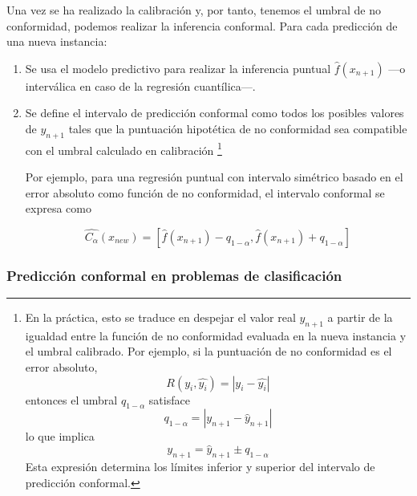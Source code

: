 Una vez se ha realizado la calibración y, por tanto, tenemos el umbral de no conformidad, podemos realizar
la inferencia conformal. Para cada predicción de una nueva instancia: 

\begin{enumerate}

    \item Se usa el modelo predictivo para realizar la inferencia puntual $\hat{f}(x_{n+1})$ ---o interválica 
    en caso de la regresión cuantílica---.

    \item Se define el intervalo de predicción conformal como todos los posibles valores de $y_{n+1}$ tales 
    que la puntuación hipotética de no conformidad sea compatible con el umbral calculado en calibración
    \footnote{
        En la práctica, esto se traduce en despejar el valor real $y_{n+1}$ a partir de la igualdad entre la 
        función de no conformidad evaluada en la nueva instancia y el umbral calibrado. Por ejemplo, si la 
        puntuación de no conformidad es el error absoluto,
        $$
        R(y_i, \hat{y_i}) = | y_i - \hat{y_i} |
        $$
        entonces el umbral $q_{1-\alpha}$ satisface
        $$
        q_{1-\alpha} = | y_{n+1} - \hat{y}_{n+1} |
        $$
        lo que implica
        $$
        y_{n+1} = \hat{y}_{n+1} \pm q_{1-\alpha}
        $$
        Esta expresión determina los límites inferior y superior del intervalo de predicción conformal.
    }

    Por ejemplo, para una regresión puntual con intervalo simétrico basado en el error absoluto como función 
    de no conformidad, el intervalo conformal se expresa como

    $$
    \hat{C_\alpha}(x_{new})=
        \left[ 
            \hat{f}(x_{n+1}) - q_{1-\alpha}, 
            \hat{f}(x_{n+1}) + q_{1-\alpha} 
        \right]
    $$


\end{enumerate}


\subsubsection{Predicción conformal en problemas de clasificación}










